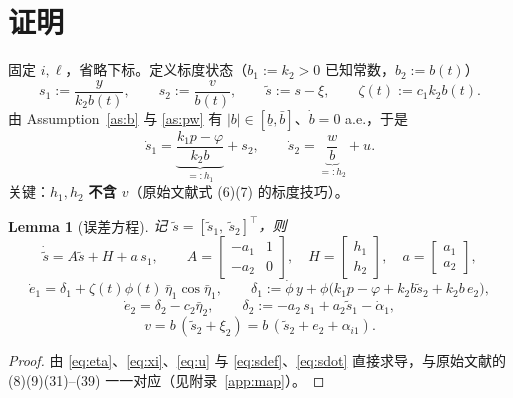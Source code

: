 \documentclass[11pt,a4paper]{article}
\newcommand{\ub}{\underline{b}}
\theoremstyle{plain}
\newtheorem{lemma}[theorem]{Lemma}
\theoremstyle{definition}
\theoremstyle{remark}
\begin{document}
\section{证明}
固定 $i,\ell$，省略下标。定义标度状态（$b_1:=k_2>0$ 已知常数，$b_2:=b(t)$）
\begin{equation}
s_1:=\frac{y}{k_2b(t)},\qquad s_2:=\frac{v}{b(t)},\qquad
\tilde s:=s-\xi,\qquad \zeta(t):=c_1k_2b(t).
\label{eq:sdef}\tag{4.1}
\end{equation}
由 Assumption~\ref{as:b} 与 \ref{as:pw} 有 $|b|\in[\ub,\bar b]$、$\dot b=0$ a.e.，于是
\begin{equation}
\dot s_1=\underbrace{\frac{k_1p-\varphi}{k_2b}}_{=:h_1}+s_2,\qquad
\dot s_2=\underbrace{\frac{w}{b}}_{=:h_2}+u .
\label{eq:sdot}\tag{4.2}
\end{equation}
关键：$h_1,h_2$ \textbf{不含 $v$}（原始文献式 (6)(7) 的标度技巧）。

\begin{lemma}[误差方程]\label{lem:err}
记 $\tilde s=[\tilde s_1,\ \tilde s_2]^\top$，则
\begin{equation}
\dot{\tilde s}=A\tilde s+H+a\,s_1,\qquad
A=\begin{bmatrix}-a_1&1\\-a_2&0\end{bmatrix},\quad
H=\begin{bmatrix}h_1\\h_2\end{bmatrix},\quad a=\begin{bmatrix}a_1\\a_2\end{bmatrix},
\label{eq:serr}\tag{4.3}
\end{equation}
\begin{equation}
\dot e_1=\delta_1+\zeta(t)\phi(t)\,\bar\eta_1\cos\bar\eta_1,\qquad
\delta_1:=\dot\phi\,y+\phi\bigl(k_1p-\varphi+k_2b\tilde s_2+k_2b\,e_2\bigr),
\label{eq:e1}\tag{4.4}
\end{equation}
\begin{equation}
\dot e_2=\delta_2-c_2\bar\eta_2,\qquad
\delta_2:=-a_2\,s_1+a_2\tilde s_1-\dot\alpha_1,
\label{eq:e2}\tag{4.5}
\end{equation}
\begin{equation}
v=b\,(\tilde s_2+\xi_2)=b\,(\tilde s_2+e_2+\alpha_{i1}).
\label{eq:v}\tag{4.6}
\end{equation}
\end{lemma}
\begin{proof}
由 \eqref{eq:eta}、\eqref{eq:xi}、\eqref{eq:u} 与 \eqref{eq:sdef}、\eqref{eq:sdot}
直接求导，与原始文献的 (8)(9)(31)--(39) 一一对应（见附录~\ref{app:map}）。
\end{proof}
\end{document}
